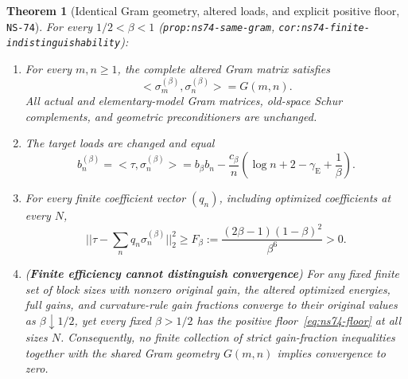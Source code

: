 \documentclass[11pt]{article}
\def\norm#1{||#1||}%
\def\ip#1#2{<#1,#2>}%
\newtheorem{theorem}{Theorem}[section]
\theoremstyle{remark}
\newcommand{\norm}[1]{\left\lVert #1\right\rVert}
\newcommand{\ip}[2]{\left\langle #1,#2\right\rangle}
\begin{document}
\begin{theorem}[Identical Gram geometry, altered loads, and explicit positive floor, \texttt{NS-74}]
\label{thm:nb-same-gram}
For every $1/2 < \beta < 1$ (\texttt{prop:ns74-same-gram}, \texttt{cor:ns74-finite-indistinguishability}):
\begin{enumerate}[label=(\roman*)]
  \item For every $m, n \ge 1$, the complete altered Gram matrix satisfies
  \[
    \ip{\sigma_m^{(\beta)}}{\sigma_n^{(\beta)}} = G(m,n).
  \]
  All actual and elementary-model Gram matrices, old-space Schur complements, and geometric preconditioners are unchanged.
  \item The target loads are changed and equal
  \begin{equation}\label{eq:ns74-loads}
    b_n^{(\beta)} = \ip{\tau}{\sigma_n^{(\beta)}} = b_\beta b_n - \frac{c_\beta}{n}\left(\log n + 2 - \gamma_{\mathrm{E}} + \frac{1}{\beta}\right).
  \end{equation}
  \item For every finite coefficient vector $(q_n)$, including optimized coefficients at every $N$,
  \begin{equation}\label{eq:ns74-floor}
    \norm{\tau - \sum_n q_n \sigma_n^{(\beta)}}_2^2 \ge F_\beta := \frac{(2\beta - 1)(1 - \beta)^2}{\beta^6} > 0.
  \end{equation}
  \item (\textbf{Finite efficiency cannot distinguish convergence}) For any fixed finite set of block sizes with nonzero original gain, the altered optimized energies, full gains, and curvature-rule gain fractions converge to their original values as $\beta \downarrow 1/2$, yet every fixed $\beta > 1/2$ has the positive floor~\eqref{eq:ns74-floor} at all sizes $N$. Consequently, no finite collection of strict gain-fraction inequalities together with the shared Gram geometry $G(m,n)$ implies convergence to zero.
\end{enumerate}
\end{theorem}
\end{document}
